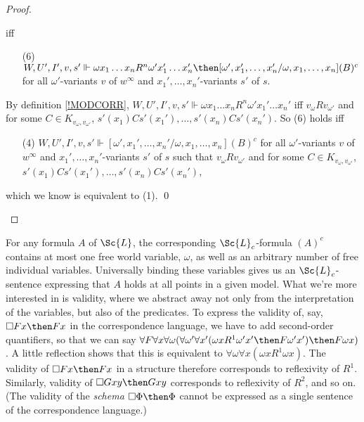 \documentclass[11pt]{woarticle}
\newcommand{\cmnt}[1]{\iffalse #1 \fi}
\theoremstyle{break}
\theoremstyle{nonumberplain}
\newcommand{\SAT}{\Vdash}
\newcommand{\1}{\;\,|\;\,}
\newcommand{\trans}[1]{(#1)^c}
\begin{document}
{\begin{proof}
\begin{enumerate}
\begin{itemize}
    \end{itemize}
    iff
    \begin{itemize}
    \item[(6)] $W,U',I',v,s' \SAT \omega x_1\ldots x_n R^n \omega'
      x_1'\ldots x_n' \then
      [\omega',x_1',\ldots,x_n'/\omega,x_1,\ldots,x_n]\trans{B}$ for
      all $\omega'$-variants $v$ of $w^\infty$ and
      $x_1',\ldots,x_n'$-variants $s'$ of $s$.
    \end{itemize}
    By definition \ref{!MODCORR}, $W,U',I',v,s' \SAT \omega x_1\ldots
    x_n R^n \omega' x_1'\ldots x_n'$ iff $v_{\omega}Rv_{\omega'}$ and
    for some $C\in K_{v_{\omega},v_{\omega'}}$,
    $s'(x_1)Cs'(x_1'),\ldots,s'(x_n)Cs'(x_n')$.  So (6) holds iff
    \begin{itemize}
    \item[(4)] $W,U',I',v,s' \SAT
      [\omega',x_1',\ldots,x_n'/\omega,x_1,\ldots,x_n]\trans{B}$ for
      all $\omega'$-variants $v$ of $w^\infty$ and
      $x_1',\ldots,x_n'$-variants $s'$ of $s$ such that
      $v_{\omega}Rv_{\omega'}$ and for some $C\in
      K_{v_{\omega},v_{\omega'}}$,
      $s'(x_1)Cs'(x_1'),\ldots,s'(x_n)Cs'(x_n')$,
    \end{itemize}
    which we know is equivalent to (1). \qed
  \end{enumerate}
\end{proof}

For any formula $A$ of $\Sc{L}$, the corresponding $\Sc{L}_c$-formula
$\trans{A}$ contains at most one free world variable, $\omega$, as
well as an arbitrary number of free individual variables. Universally
binding these variables gives us an $\Sc{L}_c$-sentence expressing
that $A$ holds at all points in a given model. What we're more
interested in is validity, where we abstract away not only from the
interpretation of the variables, but also of the predicates. To
express the validity of, say, $\Box Fx \then Fx$ in the correspondence
language, we have to add second-order quantifiers, so that we can say
$\forall F \forall x \forall \omega (\forall \omega' \forall x'(\omega
xR^1\omega' x' \then F\omega' x') \then F\omega x)$. A little
reflection shows that this is equivalent to $\forall \omega\forall x
(\omega x R^1 \omega x)$.%
\cmnt{%
  (Let $\xi$ range over world-individual pairs. Then $\forall F
  \forall x \forall \omega (\forall \omega' (\omega xR^1\omega' x'
  \then Fx') \then Fx)$ can be shortened to $\forall F \forall \xi
  (\forall \xi' (\xi R^1\xi' \then F\xi') \then F\xi)$, which is the
  standard translation for the validity of $\Box p \then p$ in PML.)%
} %
The validity of $\Box Fx \then Fx$ in a structure therefore
corresponds to reflexivity of $R^1$. Similarly, validity of $\Box Gxy
\then Gxy$ corresponds to reflexivity of $R^2$, and so on. (The
validity of the \emph{schema} $\Box \Phi \then \Phi$ cannot be
expressed as a single sentence of the correspondence language.)

} %
\end{document}
